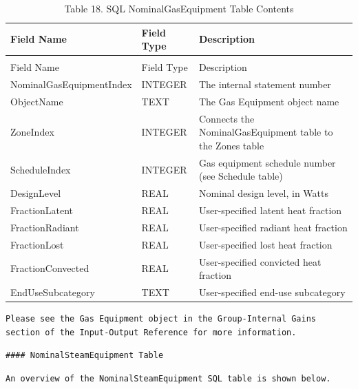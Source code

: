 \begin{longtable}[c]{p{1.5in}p{1.5in}p{3.0in}}
\caption{Table 18. SQL NominalGasEquipment Table Contents \label{table:table-18.-sql-nominalgasequipment-table}} \tabularnewline
\toprule 
Field Name & Field Type & Description \tabularnewline
\midrule
\endfirsthead

\caption[]{Table 18. SQL NominalGasEquipment Table Contents} \tabularnewline
\toprule 
Field Name & Field Type & Description \tabularnewline
\midrule
\endhead

NominalGasEquipmentIndex & INTEGER & The internal statement number \tabularnewline
ObjectName & TEXT & The Gas Equipment object name \tabularnewline
ZoneIndex & INTEGER & Connects the NominalGasEquipment table to the Zones table \tabularnewline
ScheduleIndex & INTEGER & Gas equipment schedule number (see Schedule table) \tabularnewline
DesignLevel & REAL & Nominal design level, in Watts \tabularnewline
FractionLatent & REAL & User-specified latent heat fraction \tabularnewline
FractionRadiant & REAL & User-specified radiant heat fraction \tabularnewline
FractionLost & REAL & User-specified lost heat fraction \tabularnewline
FractionConvected & REAL & User-specified convicted heat fraction \tabularnewline
EndUseSubcategory & TEXT & User-specified end-use subcategory \tabularnewline
\bottomrule
\end{longtable}

\begin{lstlisting}
Please see the Gas Equipment object in the Group-Internal Gains section of the Input-Output Reference for more information.
\end{lstlisting}

\begin{lstlisting}
#### NominalSteamEquipment Table
\end{lstlisting}

\begin{lstlisting}
An overview of the NominalSteamEquipment SQL table is shown below.
\end{lstlisting}

